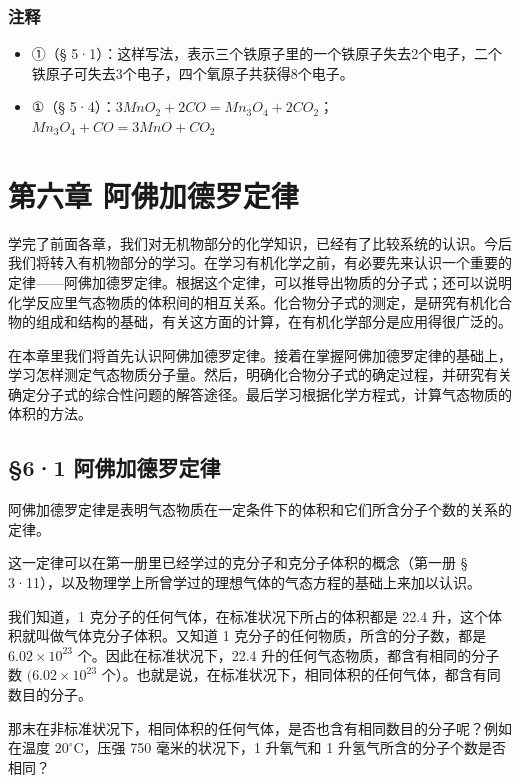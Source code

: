 \subsection{注释}

\begin{itemize}
\item
  ①（§
  5·1）：这样写法，表示三个铁原子里的一个铁原子失去2个电子，二个铁原子可失去3个电子，四个氧原子共获得8个电子。
\item
  ①（§ 5·4）：\(3MnO_{2} + 2CO = Mn_{3}O_{4} + 2CO_{2}\)；
  \(Mn_{3}O_{4} + CO = 3MnO + CO_{2}\)
\end{itemize}

\chapter{第六章 阿佛加德罗定律}

学完了前面各章，我们对无机物部分的化学知识，已经有了比较系统的认识。今后我们将转入有机物部分的学习。在学习有机化学之前，有必要先来认识一个重要的定律------阿佛加德罗定律。根据这个定律，可以推导出物质的分子式；还可以说明化学反应里气态物质的体积间的相互关系。化合物分子式的测定，是研究有机化合物的组成和结构的基础，有关这方面的计算，在有机化学部分是应用得很广泛的。

在本章里我们将首先认识阿佛加德罗定律。接着在掌握阿佛加德罗定律的基础上，学习怎样测定气态物质分子量。然后，明确化合物分子式的确定过程，并研究有关确定分子式的综合性问题的解答途径。最后学习根据化学方程式，计算气态物质的体积的方法。

\section{§6·1 阿佛加德罗定律}

阿佛加德罗定律是表明气态物质在一定条件下的体积和它们所含分子个数的关系的定律。

这一定律可以在第一册里已经学过的克分子和克分子体积的概念（第一册 §
3·11），以及物理学上所曾学过的理想气体的气态方程的基础上来加以认识。

我们知道，1 克分子的任何气体，在标准状况下所占的体积都是 22.4
升，这个体积就叫做气体克分子体积。又知道 1
克分子的任何物质，所含的分子数，都是 \(6.02 \times 10^{23}\)
个。因此在标准状况下，22.4 升的任何气态物质，都含有相同的分子数
\((6.02 \times 10^{23}\)
个）。也就是说，在标准状况下，相同体积的任何气体，都含有同数目的分子。

那末在非标准状况下，相同体积的任何气体，是否也含有相同数目的分子呢？例如在温度
\(20^{\circ} \mathrm{C}\)，压强 750 毫米的状况下，1 升氧气和 1
升氢气所含的分子个数是否相同？

